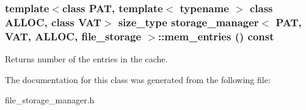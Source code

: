 \subsubsection{\setlength{\rightskip}{0pt plus 5cm}template$<$class PAT, template$<$ typename $>$ class ALLOC, class VAT$>$ size\_\-type \bf{storage\_\-manager}$<$ PAT, VAT, ALLOC, \bf{file\_\-storage} $>$::mem\_\-entries () const\hspace{0.3cm}{\tt  [inline]}}\label{classstorage__manager_3_01PAT_00_01VAT_00_01ALLOC_00_01file__storage_01_4_5f46edcf9f6fe543d97cfd8a8507964a}


Returns number of the entries in the cache. 

The documentation for this class was generated from the following file:\begin{CompactItemize}
\item 
file\_\-storage\_\-manager.h\end{CompactItemize}
